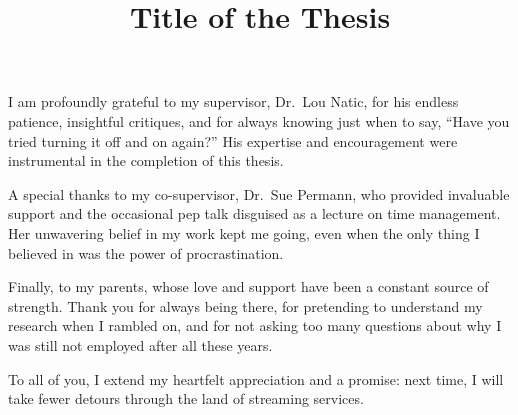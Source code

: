 \documentclass{iutbscthesis}
\title{Title of the Thesis}
\begin{document}

\coverpage


\titlepage

\declarationofcandidate


\tableofcontents
\listoffigures
\listoftables

\clearpage

\begin{abbreviations}
\end{abbreviations}

\begin{acknowledgement}

I am profoundly grateful to my supervisor, Dr.\ Lou Natic, for his endless patience, insightful critiques, and for always knowing just when to say, ``Have you tried turning it off and on again?'' His expertise and encouragement were instrumental in the completion of this thesis.

A special thanks to my co-supervisor, Dr.\ Sue Permann, who provided invaluable support and the occasional pep talk disguised as a lecture on time management. Her unwavering belief in my work kept me going, even when the only thing I believed in was the power of procrastination.

Finally, to my parents, whose love and support have been a constant source of strength. Thank you for always being there, for pretending to understand my research when I rambled on, and for not asking too many questions about why I was still not employed after all these years.

To all of you, I extend my heartfelt appreciation and a promise: next time, I will take fewer detours through the land of streaming services.
\end{acknowledgement}
\end{document}
